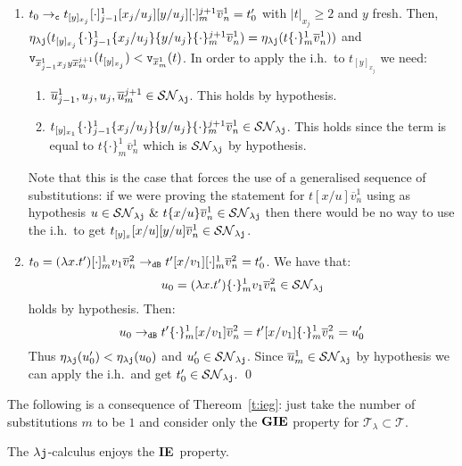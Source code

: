 \documentclass{LMCS}
\renewcommand{\>}{\rightarrow}
\def\lam{\lambda}
\newcommand{\Rew}[1]{\rightarrow_{#1}}
\newcommand{\isubs}[1]{ \{ #1  \} }
\newcommand{\SN}[1]{\mathcal{SN}_{#1}}
\newcommand{\B}{{\tt dB}}
\newcommand{\ttv}{{\tt v}}
\newcommand{\dis}{{\tt j}}
\newcommand{\ldis}{\lam{\dis}}
\newcommand{\DSubs}{{\tt c}}
\newcommand{\ih}{i.h.}
\newcommand{\terms}{\mathcal{T}}
\newcommand{\termslambda}{\terms_{\lam}}
\newcommand{\fo}[2]{\ttv_{#2}(#1)}
\newcommand{\iep}{{\bf IE}}
\newcommand{\giep}{{\bf GIE}}
\newcommand{\ovl}[3]{\overline{#1}^{#2}_{#3}}
\newcommand{\espp}[4]{[\cdot]^{#3}_{#4}}
\newcommand{\spp}[4]{\{\cdot\}^{#3}_{#4}}
\begin{document}
\begin{enumerate}[$\bullet$]
\item $t_0\Rew{\DSubs} t_{[y]_{x_j}}\espp{x}{u}{1}{j-1} [x_j/u_j][y/u_j] \espp{x}{u}{j+1}{m}  \ovl{v}{1}{n} = t'_0$
with $|t|_{x_j} \geq 2$ and $y$ fresh. Then, \\ 
 $\eta_{\ldis}(t_{[y]_{x_j}}\spp{x}{u}{1}{j-1} \isubs{x_j/u_j}\isubs{y/u_j}\spp{x}{u}{j+1}{m} \ovl{v}{1}{n}) = 
\eta_{\ldis}(t\spp{x}{u}{1}{m} \ovl{v}{1}{n}))$ and\\
$\fo{t_{[y]_{x_j}}}{\ovl{x}{1}{j-1} x_j y\ovl{x}{j+1}{m}} < \fo{t}{\ovl{x}{1}{m}}$. 
In order to apply the \ih\ to $t_{[y]_{x_j}}$  we need:  
\begin{enumerate}[$-$]
\item $\ovl{u}{1}{j-1}, u_j, u_j,  \ovl{u}{j+1}{m} \in \SN{\ldis}$. This holds by hypothesis.
\item $t_{[y]_{x_1}}\spp{x}{u}{1}{j-1}  \isubs{x_j/u_j}\isubs{y/u_j}\spp{x}{u}{j+1}{m} \ovl{v}{1}{n} \in \SN{\ldis}$. 
This holds since the term is equal to $t\spp{x}{u}{1}{m} \ovl{v}{1}{n}$ which is $\SN{\ldis}$ by hypothesis.
\end{enumerate}

Note that this is the case that forces the
use of a  generalised sequence of substitutions: if we were proving the
statement for $t [x/u] \ovl{v}{1}{n}$ using as hypothesis $u \in
\SN{\ldis}\ \&\ t\isubs{x/u} \ovl{v}{1}{n} \in \SN{\ldis}$ then there
would be no way to use the \ih\ to get $t_{[y]_{x}}
[x/u][y/u] \ovl{v}{1}{n}\in \SN{\ldis}$.

\item $t_0 =  (\lam x. t')\espp{x}{u}{1}{m} v_1\ovl{v}{2}{n} \Rew{\B}
     t'[x/v_1]\espp{x}{u}{1}{m} \ovl{v}{2}{n} =t'_0$. We
     have that:
     $$u_0= (\lam  x. t')\spp{x}{u}{1}{m} v_1\ovl{v}{2}{n} \in \SN{\ldis}$$
     holds by hypothesis. Then:
\[ 
u_0 \Rew{\B}  t'\spp{x}{u}{1}{m}[x/v_1] \ovl{v}{2}{n} = t'[x/v_1]\spp{x}{u}{1}{m} \ovl{v}{2}{n}=u'_0 \]
Thus $\eta_{\ldis}(u'_0) < \eta_{\ldis}(u_0)$ and $u'_0\in
\SN{\ldis}$. Since $ \ovl{u}{1}{m} \in \SN{\ldis}$ by hypothesis we
can apply the \ih\ and get $t'_0 \in \SN{\ldis}$.
\qed\medskip
\end{enumerate}

\noindent The following is a consequence of Thereom~\ref{t:ieg}: just take
the number of substitutions $m$ to be $1$ and consider only
the $\giep$ property for $\termslambda  \subset \terms$. 



\begin{cor}[\iep\ for $\ldis$]
\label{t:ieldis}
The $\ldis$-calculus enjoys the \iep\ property.
\end{cor}
\end{document}
